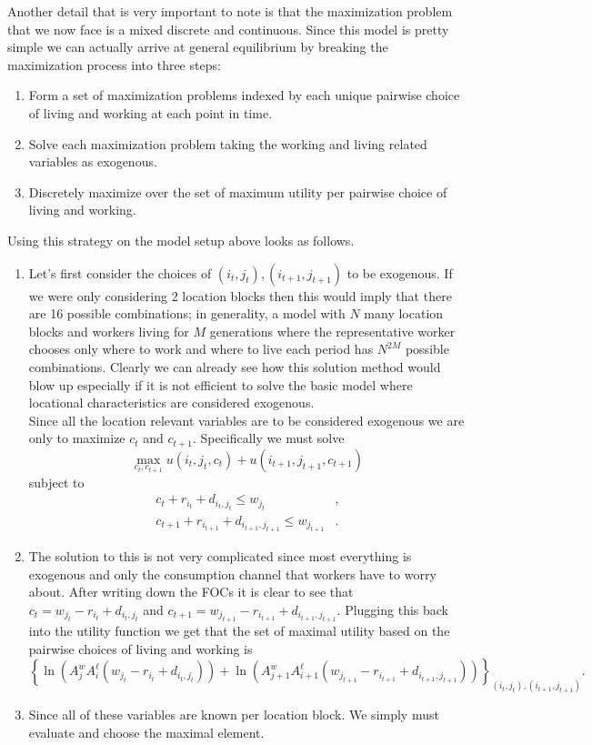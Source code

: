 \documentclass[11pt,english]{article}
\begin{document}
\noindent Another detail that is very important to note is that the maximization problem that we now face is a mixed discrete and continuous. Since this model is pretty simple we can actually arrive at general equilibrium by breaking the maximization process into three steps:
\begin{enumerate}
\item Form a set of maximization problems indexed by each unique pairwise choice of living and working at each point in time.

\item Solve each maximization problem taking the working and living related variables as exogenous.

\item Discretely maximize over the set of maximum utility per pairwise choice of living and working.
\end{enumerate}
Using this strategy on the model setup above looks as follows.
\begin{enumerate}
\item Let's first consider the choices of $(i_t,j_t), (i_{t+1}, j_{t+1})$ to be exogenous. If we were only considering 2 location blocks then this would imply that there are 16 possible combinations; in generality, a model with $N$ many location blocks and workers living for $M$ generations where the representative worker chooses only where to work and where to live each period has $N^{2M}$ possible combinations. Clearly we can already see how this solution method would blow up especially if it is not efficient to solve the basic model where locational characteristics are considered exogenous.\\

\noindent Since all the location relevant variables are to be considered exogenous we are only to maximize $c_t$ and $c_{t+1}$. Specifically we must solve $$\max_{c_t, c_{t+1}} u(i_t,j_t, c_t) + u(i_{t+1},j_{t+1}, c_{t+1})$$ subject to
\begin{align*}
c_t + r_{i_t} + d_{i_t,j_t}\leq w_{j_t}&,\\
c_{t+1} + r_{i_{t+1}} + d_{i_{t+1}, j_{t+1}}\leq w_{j_{t+1}}&.
\end{align*}

\item The solution to this is not very complicated since most everything is exogenous and only the consumption channel that workers have to worry about. After writing down the FOCs it is clear to see that $c_t = w_{j_t} - r_{i_t} + d_{i_t,j_t}$ and $c_{t+1} = w_{j_{t+1}} - r_{i_{t+1}} + d_{i_{t+1},j_{t+1}}$. Plugging this back into the utility function we get that the set of maximal utility based on the pairwise choices of living and working is $$\left\{\ln\left(A^w_jA^\ell_i (w_{j_t} - r_{i_t} + d_{i_t,j_t})\right) + \ln\left(A^w_{j+1}A^\ell_{i+1} (w_{j_{t+1}} - r_{i_{t+1}} + d_{i_{t+1},j_{t+1}})\right)\right\}_{(i_t, j_t), (i_{t+1}, j_{t+1})}.$$

\item Since all of these variables are known per location block. We simply must evaluate and choose the maximal element.
\end{enumerate}
\end{document}
